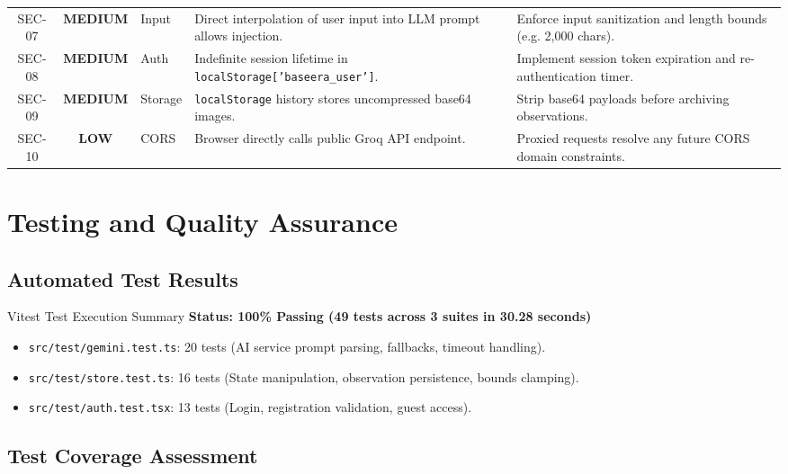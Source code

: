 \documentclass[10pt,a4paper]{report}
\newcommand{\badgeMed}{\colorbox{yellow!30}{\textcolor{warnOrange!80!black}{\bfseries\scriptsize MEDIUM}}}
\newcommand{\badgeLow}{\colorbox{green!15}{\textcolor{passGreen}{\bfseries\scriptsize LOW}}}
\begin{document}
\begin{table}[htbp]
\begin{tabularx}{\textwidth}{c c l X p{3.5cm}}
\addlinespace
SEC-07 & \badgeMed & Input & Direct interpolation of user input into LLM prompt allows injection. & Enforce input sanitization and length bounds (e.g. 2,000 chars). \\
\addlinespace
SEC-08 & \badgeMed & Auth & Indefinite session lifetime in \texttt{localStorage['baseera\_user']}. & Implement session token expiration and re-authentication timer. \\
\addlinespace
SEC-09 & \badgeMed & Storage & \texttt{localStorage} history stores uncompressed base64 images. & Strip base64 payloads before archiving observations. \\
\addlinespace
SEC-10 & \badgeLow & CORS & Browser directly calls public Groq API endpoint. & Proxied requests resolve any future CORS domain constraints. \\
\bottomrule
\end{tabularx}
\end{table}

\chapter{Testing and Quality Assurance}

\section{Automated Test Results}
\begin{passBox}{Vitest Test Execution Summary}
\textbf{Status: 100\% Passing (49 tests across 3 suites in 30.28 seconds)}
\begin{itemize}[leftmargin=1.5em]
    \item \texttt{src/test/gemini.test.ts}: 20 tests (AI service prompt parsing, fallbacks, timeout handling).
    \item \texttt{src/test/store.test.ts}: 16 tests (State manipulation, observation persistence, bounds clamping).
    \item \texttt{src/test/auth.test.tsx}: 13 tests (Login, registration validation, guest access).
\end{itemize}
\end{passBox}

\section{Test Coverage Assessment}
\end{document}
